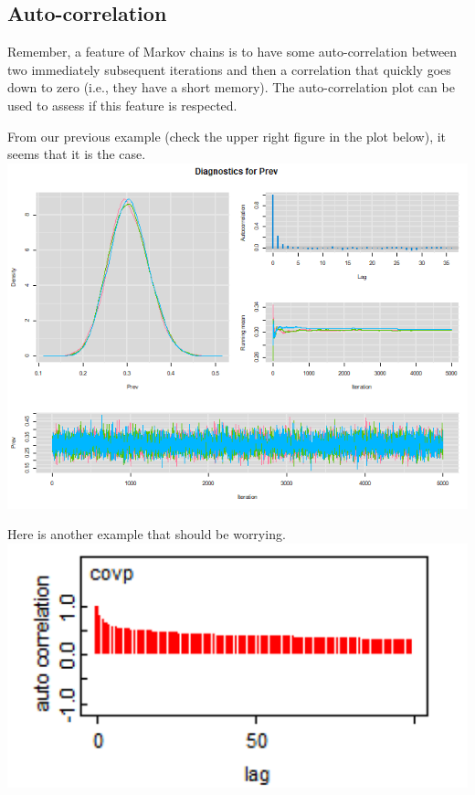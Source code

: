 \documentclass[
]{book}
\begin{document}
\hypertarget{auto-correlation}{%
\subsection{Auto-correlation}\label{auto-correlation}}

Remember, a feature of Markov chains is to have some auto-correlation
between two immediately subsequent iterations and then a correlation
that quickly goes down to zero (i.e., they have a short memory). The
auto-correlation plot can be used to assess if this feature is
respected.

From our previous example (check the upper right figure in the plot
below), it seems that it is the case.\\
\includegraphics{Figures/Nice chains RM.png}

Here is another example that should be worrying.\\
\includegraphics{Figures/Autocor bad.png}
\end{document}
